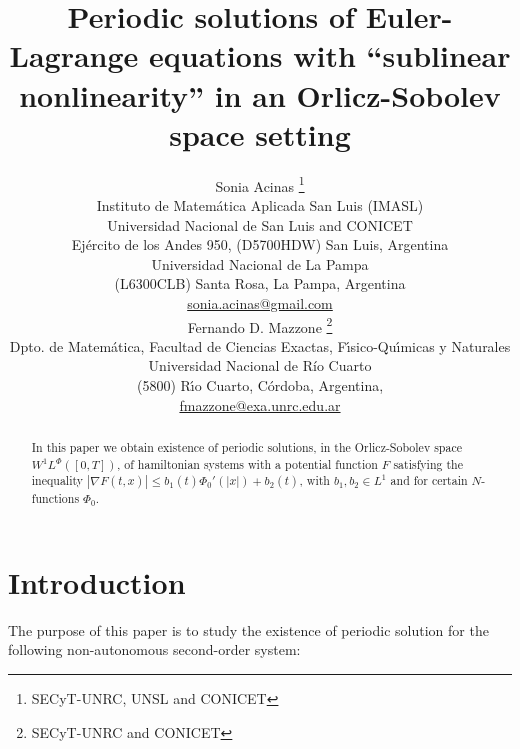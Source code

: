 \documentclass[twoside]{article}
\title{Periodic solutions of 
Euler-Lagrange equations with ``sublinear nonlinearity'' in an Orlicz-Sobolev space setting}
\author{Sonia Acinas \thanks{SECyT-UNRC, UNSL and CONICET}\\
Instituto de Matem\'atica Aplicada San Luis (IMASL)\\ 
Universidad Nacional de San Luis and CONICET\\
Ej\'ercito de los Andes 950,
(D5700HDW) San Luis, Argentina\\
Universidad Nacional de La Pampa\\
(L6300CLB) Santa Rosa, La Pampa, Argentina\\
\url{sonia.acinas@gmail.com}\\[3mm]
Fernando D. Mazzone \thanks{SECyT-UNRC and CONICET}\\
Dpto. de Matem\'atica, Facultad de Ciencias Exactas, F\'{\i}sico-Qu\'{\i}micas y Naturales\\
Universidad Nacional de R\'{i}o Cuarto\\
(5800) R\'{\i}o Cuarto, C\'ordoba, Argentina,\\
\url{fmazzone@exa.unrc.edu.ar}
}
\date{}
\theoremstyle{remark}
\newcommand{\lphi}{L^{\Phi}}
\newcommand{\wphi}{W^{1}\lphi}
\renewcommand{\leq}{\leqslant}
\begin{document}
\maketitle
%
\begingroup%
    \renewcommand{\thefootnote}{}%
    \endgroup
%
%
%
%

\begin{abstract}

In this paper we obtain existence of periodic solutions, in the Orlicz-Sobolev space $\wphi([0,T])$, of hamiltonian systems with a potential  function $F$ satisfying the inequality  $|\nabla F(t,x)|\leq b_1(t) \Phi_0'(|x|)+b_2(t)$, with    $b_1, b_2\in L^1$ and for certain $N$-functions $\Phi_0$.

\end{abstract}




\pagestyle{fancy} \headheight 35pt \fancyhead{} \fancyfoot{}

\fancyfoot[C]{\thepage}  \fancyhead[CO]{\nouppercase{\section}}

\fancyhead[CO]{\nouppercase{\leftmark}}






\section{Introduction}
The purpose of this paper is to study the existence  of periodic solution for the
following non-autonomous second-order system:
\end{document}
